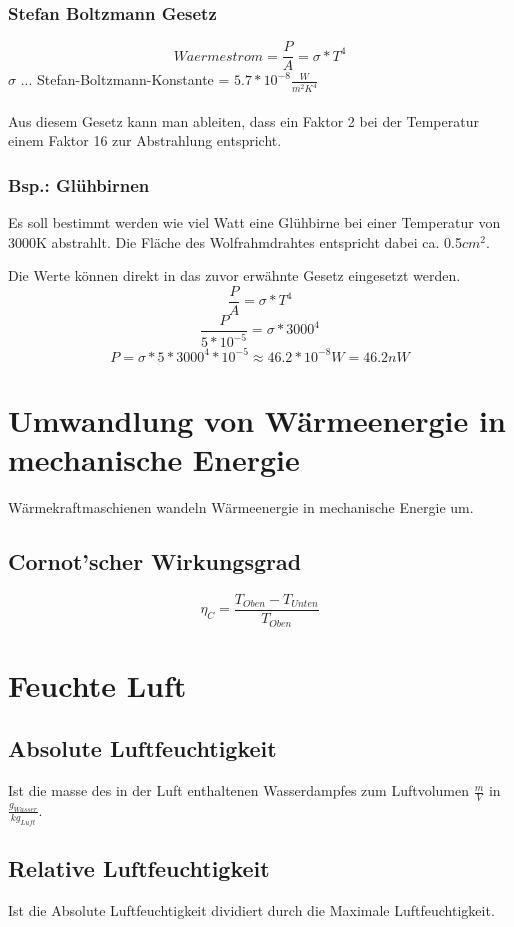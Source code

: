 \documentclass[a4paper,12pt]{article}
\begin{document}
\subsubsection{Stefan Boltzmann Gesetz}
$$Waermestrom = \frac{P}{A} = \sigma * T^4$$
$\sigma$ ... Stefan-Boltzmann-Konstante = $5.7 * 10^{-8}\frac{W}{m^2 K^4}$
\\\\
Aus diesem Gesetz kann man ableiten, dass ein Faktor 2 bei der Temperatur einem Faktor 16 zur Abstrahlung entspricht.

\subsubsection{Bsp.: Glühbirnen}
Es soll bestimmt werden wie viel Watt eine Glühbirne bei einer Temperatur von 3000K abstrahlt.
Die Fläche des Wolfrahmdrahtes entspricht dabei ca. 0.5$cm^2$.

Die Werte können direkt in das zuvor erwähnte Gesetz eingesetzt werden.
$$\frac{P}{A} = \sigma * T^4$$
$$\frac{P}{5 * 10^{-5}} = \sigma * 3000^4$$
$$P = \sigma * 5 * 3000^4 * 10^{-5} \approx 46.2 * 10^{-8}W = 46.2nW$$

\section{Umwandlung von Wärmeenergie in mechanische Energie}
Wärmekraftmaschienen wandeln Wärmeenergie in mechanische Energie um.

\subsection{Cornot'scher Wirkungsgrad}
$$\eta_C = \frac{T_{Oben} - T_{Unten}}{T_{Oben}}$$

\section{Feuchte Luft}
\subsection{Absolute Luftfeuchtigkeit}
Ist die masse des in der Luft enthaltenen Wasserdampfes zum Luftvolumen $\frac{m}{V}$ in $\frac{g_{Wasser}}{kg_{Luft}}$.
\subsection{Relative Luftfeuchtigkeit}
Ist die Absolute Luftfeuchtigkeit dividiert durch die Maximale Luftfeuchtigkeit.
\end{document}

